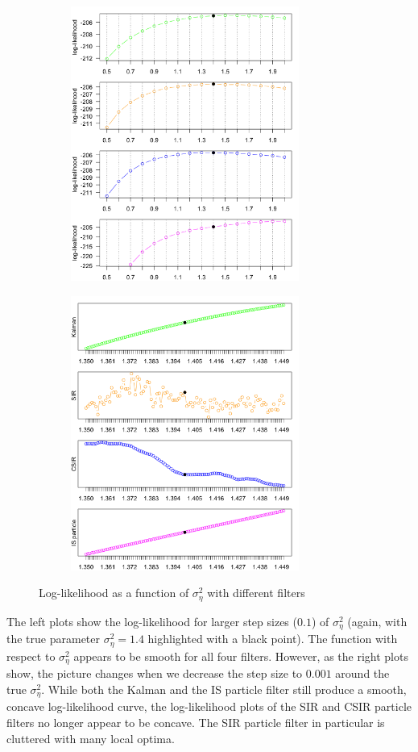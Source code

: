 \documentclass[11pt, oneside]{scrreprt}   	%
\begin{document}
\begin{figure}[h!]
\centering
\begin{subfigure}{0.5\textwidth}
  \centering
  \includegraphics[width=75mm]{../../images/ullm-loglik-eta.png}
\end{subfigure}%
\begin{subfigure}{0.5\textwidth}
  \centering
  \includegraphics[width=75mm]{../../images/ullm-loglik-zoom.png}
\end{subfigure}
\caption{Log-likelihood as a function of $\sigma_{\eta}^2$ with different filters}
\label{fig:ullm_loglik}
\end{figure}

The left plots show the log-likelihood for larger step sizes ($0.1$) of $\sigma_{\eta}^2$ (again, with the true parameter $\sigma_{\eta}^2 = 1.4$ highlighted with a black point). The function with respect to $\sigma_{\eta}^2$ appears to be smooth for all four filters. However, as the right plots show, the picture changes when we decrease the step size to $0.001$ around the true $\sigma_{\eta}^2$. While both the Kalman and the IS particle filter still produce a smooth, concave log-likelihood curve, the log-likelihood plots of the SIR and CSIR particle filters no longer appear to be concave. The SIR particle filter in particular is cluttered with many local optima.\\
\end{document}

